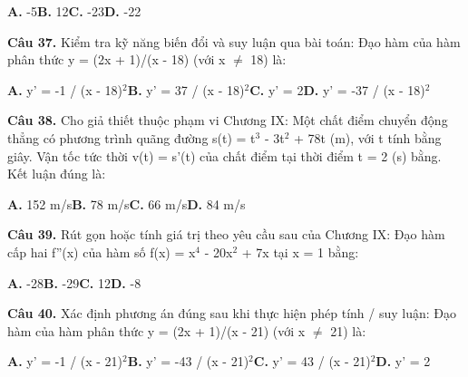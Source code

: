 \documentclass[11pt,a4paper]{article}
\begin{document}
\hspace*{1.5em}\textbf{A.} -5\quad\quad \textbf{B.} 12\quad\quad \textbf{C.} -23\quad\quad \textbf{D.} -22\par\vspace{2pt}
\textbf{\color{primary} Câu 37.} Kiểm tra kỹ năng biến đổi và suy luận qua bài toán: Đạo hàm của hàm phân thức y = (2x + 1)/(x - 18) (với x $\ne$ 18) là:\par
\hspace*{1.5em}\textbf{A.} y' = -1 / (x - 18)$^2$\quad\quad \textbf{B.} y' = 37 / (x - 18)$^2$\quad\quad \textbf{C.} y' = 2\quad\quad \textbf{D.} y' = -37 / (x - 18)$^2$\par\vspace{2pt}
\textbf{\color{primary} Câu 38.} Cho giả thiết thuộc phạm vi Chương IX: Một chất điểm chuyển động thẳng có phương trình quãng đường s(t) = t$^3$ - 3t$^2$ + 78t (m), với t tính bằng giây. Vận tốc tức thời v(t) = s'(t) của chất điểm tại thời điểm t = 2 (s) bằng. Kết luận đúng là:\par
\hspace*{1.5em}\textbf{A.} 152 m/s\quad\quad \textbf{B.} 78 m/s\quad\quad \textbf{C.} 66 m/s\quad\quad \textbf{D.} 84 m/s\par\vspace{2pt}
\textbf{\color{primary} Câu 39.} Rút gọn hoặc tính giá trị theo yêu cầu sau của Chương IX: Đạo hàm cấp hai f''(x) của hàm số f(x) = x$^4$ - 20x$^2$ + 7x tại x = 1 bằng:\par
\hspace*{1.5em}\textbf{A.} -28\quad\quad \textbf{B.} -29\quad\quad \textbf{C.} 12\quad\quad \textbf{D.} -8\par\vspace{2pt}
\textbf{\color{primary} Câu 40.} Xác định phương án đúng sau khi thực hiện phép tính / suy luận: Đạo hàm của hàm phân thức y = (2x + 1)/(x - 21) (với x $\ne$ 21) là:\par
\hspace*{1.5em}\textbf{A.} y' = -1 / (x - 21)$^2$\quad\quad \textbf{B.} y' = -43 / (x - 21)$^2$\quad\quad \textbf{C.} y' = 43 / (x - 21)$^2$\quad\quad \textbf{D.} y' = 2\par\vspace{2pt}
\end{document}
